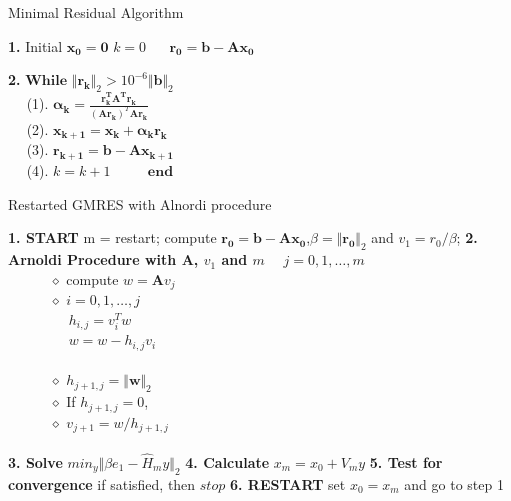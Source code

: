 \documentclass[fleqn]{article}
\begin{document}
    \begin{algorithm}[htb!]
        \caption{Minimal Residual Algorithm}
         \begin{algorithmic}
         \STATE \textbf{1.} Initial  $\bm{x_0} = \bm{0}$ $k = 0$ $\quad$ $\bm{r_0} = \bm{b} - \bm{A}\bm{x_0}$
    
         \STATE \textbf{2.} $\bm{While} $ $\Vert\bm{r_{k}}\Vert_2 > 10^{-6}\Vert\bm{b}\Vert_2$\\[1ex]
         \STATE $\quad$ (1). $\bm{\alpha_k} = \frac{\bm{r_k^TA^T}\bm{r_k}}{(\bm{A}\bm{r_k})^T\bm{A}\bm{r_k}}$\\[1ex]
         \STATE $\quad$ (2). $\bm{x_{k+1}} = \bm{x_k} + \bm{\alpha_k}\bm{r_k}$\\[1ex]
         \STATE $\quad$ (3).  $\bm{r_{k+1}} = \bm{b} - \bm{A}\bm{x_{k+1}}$\\[1ex]
         \STATE $\quad$ (4).  $k = k + 1$
         \STATE $\qquad$ $\bm{end}$\\[1ex]
        \end{algorithmic}
    \end{algorithm}


\begin{algorithm}[htb!]
                  \caption{Restarted GMRES with Alnordi procedure}              
         \label{alg4}                         
         \begin{algorithmic}
         \STATE\textbf{1. START} m = restart; compute  $\bm{r_0} = \bm{b} - \bm{A}\bm{x_0}$,$\beta = \Vert\bm{r_{0}}\Vert_2 $ and $v_1 = r_0/\beta$;
         \STATE\textbf{2. Arnoldi Procedure with A, $v_1$ and $m$}
             \STATE $\quad$\quad $j = 0, 1, \dots , m $\\[1ex]
             \STATE $\qquad\quad  \diamond$ compute $w = \bm{A}v_j$\\[1ex]
             \STATE $\qquad\quad  \diamond$  \text{ } $i = 0, 1, \dots , j $ \\[1ex]
             \STATE $\qquad\quad \quad$ $h_{i,j} = {v_i^Tw}$ \\[1ex]
             \STATE $\qquad\quad \quad$ $w = w - h_{i,j}v_i $\\[1ex]
             \STATE $\qquad\quad \quad$ \text{ } \\[1ex]
             \STATE $\qquad\quad  \diamond$ $h_{j+1,j} = \Vert\bm{w}\Vert_2$\\[1ex]
             \STATE $\qquad\quad  \diamond$ If $h_{j+1,j} = 0$, \\[1ex]
             \STATE $\qquad\quad  \diamond$ $v_{j+1} = w/h_{j+1,j}$\\[1ex]
             \STATE $\qquad$ \text{}\text{ }\\[1ex]
         \STATE\textbf{  3. Solve} $min_y\Vert\beta e_1 - \widehat{H}_my\Vert_2$ 
         \STATE\textbf{  4. Calculate} $x_m = x_0 + V_my$
         \STATE\textbf{  5. Test for convergence} if satisfied, then $stop$
         \STATE\textbf{  6. RESTART} set $x_0 = x_m$ and go to step 1
         
        \end{algorithmic}
\end{algorithm}   
\newpage
\end{document}

